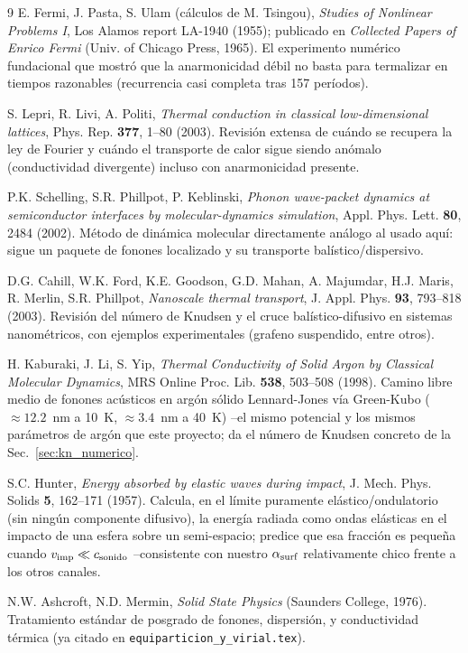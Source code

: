 \documentclass[11pt,a4paper]{article}
\begin{document}
\begin{thebibliography}{9}
E. Fermi, J. Pasta, S. Ulam (cálculos de M. Tsingou), \textit{Studies of
Nonlinear Problems I}, Los Alamos report LA-1940 (1955); publicado en
\textit{Collected Papers of Enrico Fermi} (Univ. of Chicago Press, 1965).
El experimento numérico fundacional que mostró que la anarmonicidad débil
no basta para termalizar en tiempos razonables (recurrencia casi completa
tras 157 períodos).

S. Lepri, R. Livi, A. Politi, \textit{Thermal conduction in classical
low-dimensional lattices}, Phys. Rep. \textbf{377}, 1--80 (2003). Revisión
extensa de cuándo se recupera la ley de Fourier y cuándo el transporte de
calor sigue siendo anómalo (conductividad divergente) incluso con
anarmonicidad presente.

P.K. Schelling, S.R. Phillpot, P. Keblinski, \textit{Phonon wave-packet
dynamics at semiconductor interfaces by molecular-dynamics simulation},
Appl. Phys. Lett. \textbf{80}, 2484 (2002). Método de dinámica molecular
directamente análogo al usado aquí: sigue un paquete de fonones localizado
y su transporte balístico/dispersivo.

D.G. Cahill, W.K. Ford, K.E. Goodson, G.D. Mahan, A. Majumdar, H.J. Maris,
R. Merlin, S.R. Phillpot, \textit{Nanoscale thermal transport}, J. Appl.
Phys. \textbf{93}, 793--818 (2003). Revisión del número de Knudsen y el
cruce balístico-difusivo en sistemas nanométricos, con ejemplos
experimentales (grafeno suspendido, entre otros).

H. Kaburaki, J. Li, S. Yip, \textit{Thermal Conductivity of Solid Argon by
Classical Molecular Dynamics}, MRS Online Proc. Lib. \textbf{538}, 503--508
(1998). Camino libre medio de fonones acústicos en argón sólido
Lennard-Jones vía Green-Kubo ($\approx12.2$~nm a 10~K, $\approx3.4$~nm a
40~K) --el mismo potencial y los mismos parámetros de argón que este
proyecto; da el número de Knudsen concreto de la Sec.~\ref{sec:kn_numerico}.

S.C. Hunter, \textit{Energy absorbed by elastic waves during impact}, J.
Mech. Phys. Solids \textbf{5}, 162--171 (1957). Calcula, en el límite
puramente elástico/ondulatorio (sin ningún componente difusivo), la energía
radiada como ondas elásticas en el impacto de una esfera sobre un
semi-espacio; predice que esa fracción es pequeña cuando $v_{\rm imp} \ll
c_{\rm sonido}$ --consistente con nuestro $\alpha_{\rm surf}$ relativamente
chico frente a los otros canales.

N.W. Ashcroft, N.D. Mermin, \textit{Solid State Physics} (Saunders College,
1976). Tratamiento estándar de posgrado de fonones, dispersión, y
conductividad térmica (ya citado en \texttt{equiparticion\_y\_virial.tex}).

\end{thebibliography}
\end{document}
